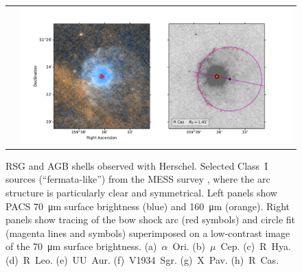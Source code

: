\begin{figure}
\begin{tabular}{ll}
    & \includegraphics[trim=10 0 65 20, clip]{figs/rcas-imageplot}
  \end{tabular}
  \caption{RSG and AGB shells observed with Herschel.  Selected
    Class~I sources (``fermata-like'') from the MESS survey
    \citet{Cox:2012a}, where the arc structure is particularly clear
    and symmetrical.  Left panels show PACS \SI{70}{\um} surface
    brightness (blue) and \SI{160}{\um} (orange).  Right panels show
    tracing of the bow shock arc (red symbols) and circle fit (magenta
    lines and symbols) superimposed on a low-contrast image of the
    \SI{70}{\um} surface brightness. (a)~\(\alpha\)~Ori. (b)~\(\mu\)~Cep.
    (c)~R~Hya. (d)~R~Leo. (e)~UU~Aur. (f)~V1934~Sgr. (g)~X~Pav.
    (h)~R~Cas.}
  \label{fig:herschel-arc-fits}
\end{figure}


